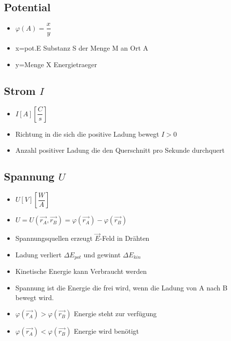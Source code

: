 \documentclass[8pt,a4paper]{scrartcl}
\begin{document}
\begin{multicols*}{3}
\begin{itemize}
			\end{itemize}
		\subsection{Potential }
			\begin{itemize}\itemsep0pt			
				\item $\varphi (A)=\dfrac{x}{y}$
				\item x=pot.E Substanz S der Menge M an Ort A
				\item y=Menge X Energietraeger
			\end{itemize}
			
		\subsection{Strom $I$}
			\begin{itemize}\itemsep0pt				
				\item $I [A] [\dfrac{C}{s}]$
				\item Richtung in die sich die positive Ladung bewegt $I>0$
				\item Anzahl positiver Ladung die den Querschnitt pro Sekunde durchquert
			\end{itemize}
			
		\subsection{Spannung $U$}
			\begin{itemize}\itemsep0pt				
				\item $U [V] [\dfrac{W}{A}]$
				\item $U=U(\overrightarrow{r_{A}},\overrightarrow{r_{B}})=\varphi(\overrightarrow{r_{A}})-\varphi(\overrightarrow{r_{B}})$
				\item Spannungsquellen erzeugt $\overrightarrow{E}$-Feld in Drähten
				\item Ladung verliert $\Delta E_{pot}$ und gewinnt $\Delta E_{kin}$
				\item Kinetische Energie kann Verbraucht werden
				\item Spannung ist die Energie die frei wird, wenn die Ladung von A nach B bewegt wird.
				\item $\varphi(\overrightarrow{r_{A}})>\varphi(\overrightarrow{r_{B}})$ Energie steht zur verfügung
				\item $\varphi(\overrightarrow{r_{A}})<\varphi(\overrightarrow{r_{B}})$ Energie wird benötigt
			\end{itemize}
			

\end{multicols*}
\end{document}
